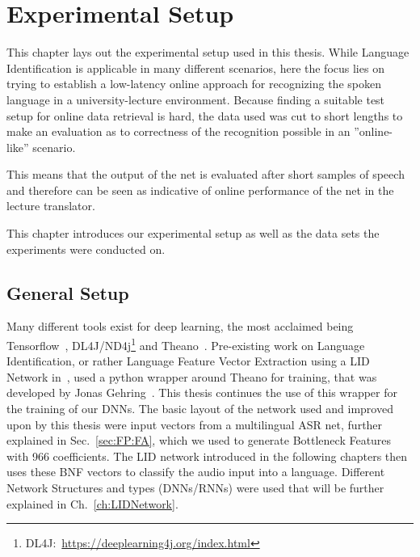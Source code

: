 




\chapter{Experimental Setup}
\label{ch:LITasks}

This chapter lays out the experimental setup used in this thesis. While Language Identification is applicable in many different scenarios, here the focus lies on trying to establish a low-latency online approach for recognizing the spoken language in a university-lecture environment. Because finding a suitable test setup for online data retrieval is hard, the data used was cut to short lengths to make an evaluation as to correctness of the recognition possible in an ''online-like'' scenario. 

This means that the output of the net is evaluated after short samples of speech and therefore can be seen as indicative of online performance of the net in the lecture translator.

This chapter introduces our experimental setup as well as the data sets the experiments were conducted on.

\section{General Setup}
\label{sec:LITasks:GS}

Many different tools exist for deep learning, the most acclaimed being Tensorflow~\cite{DBLP:journals/corr/AbadiABBCCCDDDG16}, DL4J/ND4j\footnote{DL4J:~\url{https://deeplearning4j.org/index.html}} and Theano~\cite{bergstra2011theano}. Pre-existing work on Language Identification, or rather Language Feature Vector Extraction using a LID Network in~\cite{Mueller2016b}, used a python wrapper around Theano for training, that was developed by Jonas Gehring~\cite{gehringMA}. This thesis continues the use of this wrapper for the training of our DNNs. The basic layout of the network used and improved upon by this thesis were input vectors from a multilingual ASR net, further explained in Sec.~\ref{sec:FP:FA}, which we used to generate Bottleneck Features with 966 coefficients. The LID network introduced in the following chapters then uses these BNF vectors to classify the audio input into a language. Different Network Structures and types (DNNs/RNNs) were used that will be further explained in Ch.~\ref{ch:LIDNetwork}. 


